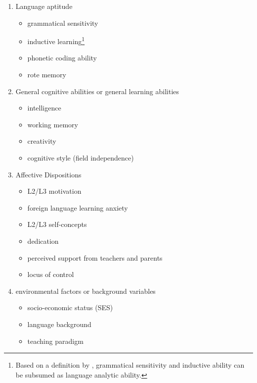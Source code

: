\documentclass[output=paper]{langsci/langscibook}
\begin{document}
\begin{enumerate}
\item Language aptitude 

\begin{itemize}
\item grammatical sensitivity
\item inductive learning\footnote{Based on a definition by \citet{Skehan1998}, grammatical sensitivity and inductive ability can be subsumed as language analytic ability.}
\item phonetic coding ability
\item rote memory
\end{itemize}

\item General cognitive abilities or general learning abilities
\begin{itemize}
\item intelligence
\item working memory
\item creativity
\item cognitive style (field independence)
\end{itemize}

\item Affective Dispositions

\begin{itemize}
\item L2/L3 motivation
\item foreign language learning anxiety
\item L2/L3 self-concepts
\item dedication
\item perceived support from teachers and parents
\item locus of control
\end{itemize}

\item environmental factors or background variables

\begin{itemize}
\item socio-economic status (SES)
\item language background
\item teaching paradigm 
\end{itemize}
\end{enumerate}
\end{document}
